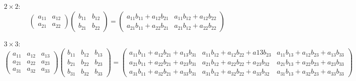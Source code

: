 \documentclass[reqno]{amsart}
\theoremstyle{definition}
\begin{document}
$2 \times 2$:
%
\begin{equation}
\begin{pmatrix}
a_{11} & a_{12}\\
a_{21} & a_{22}
\end{pmatrix}\begin{pmatrix}
b_{11} & b_{12}\\
b_{21} & b_{22}
\end{pmatrix} = \begin{pmatrix}
a_{11}b_{11} + a_{12}b_{21} & a_{11}b_{12} + a_{12}b_{22}\\
a_{21}b_{11} + a_{22}b_{21} & a_{21}b_{12} + a_{22}b_{22}
\end{pmatrix}
\end{equation}

$3 \times 3$:
%
\begin{equation}
\begin{pmatrix}
a_{11} & a_{12} & a_{13}\\
a_{21} & a_{22} & a_{23}\\
a_{31} & a_{32} & a_{33}
\end{pmatrix}\begin{pmatrix}
b_{11} & b_{12} & b_{13}\\
b_{21} & b_{22} & b_{23}\\
b_{31} & b_{32} & b_{33}
\end{pmatrix} = \begin{pmatrix}
a_{11}b_{11} + a_{12}b_{21} + a_{13}b_{31} & a_{11}b_{12} + a_{12}b_{22} + a{13}b_{23}
& a_{11}b_{13} + a_{12}b_{23} + a_{13}b_{33}\\
a_{21}b_{11} + a_{22}b_{21} + a_{23}b_{31} & a_{21}b_{12} + a_{22}b_{22} + a_{23}b_{32}
& a_{21}b_{13} + a_{22}b_{23} + a_{23}b_{33}\\
a_{31}b_{11} + a_{32}b_{21} + a_{33}b_{31} & a_{31}b_{12} + a_{32}b_{22} + a_{33}b_{32}
& a_{31}b_{13} + a_{32}b_{23} + a_{33}b_{33}
\end{pmatrix}
\end{equation}
\end{document}
